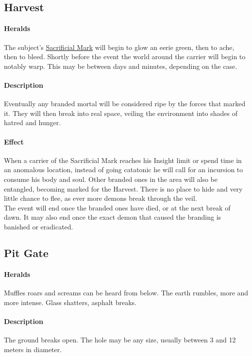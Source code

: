 \subsection*{Harvest}
\label{anomaly:harvest}
\paragraph{Heralds}
The subject's \hyperref[boon:markofsacrifice]{Sacrificial Mark} will begin to glow an eerie green,
	then to ache,
	then to bleed.
Shortly before the event the world around the carrier will begin to notably warp.
This may be between days and minutes, depending on the case.
\paragraph{Description}
Eventually any branded mortal will be considered ripe by the forces that marked it.
They will then break into real space,
	veiling the environment into shades of hatred and hunger.
\paragraph{Effect}
When a carrier of the Sacrificial Mark reaches his Insight limit
	or spend time in an anomalous location,
	instead of going catatonic he will call for an incursion to consume his body and soul.
Other branded ones in the area will also be entangled,
	becoming marked for the Harvest.
There is no place to hide
	and very little chance to flee,
	as ever more demons break through the veil.
\\%
The event will end once the branded ones have died,
	or at the next break of dawn.
It may also end once the exact demon that caused the branding is banished or eradicated.
\subsection*{Pit Gate}
\paragraph{Heralds}
Muffles roars and screams can be heard from below.
The earth rumbles, more and more intense.
Glass shatters, asphalt breaks.
\paragraph{Description}
The ground breaks open.
The hole may be any size,
	usually between 3 and 12 meters in diameter.
